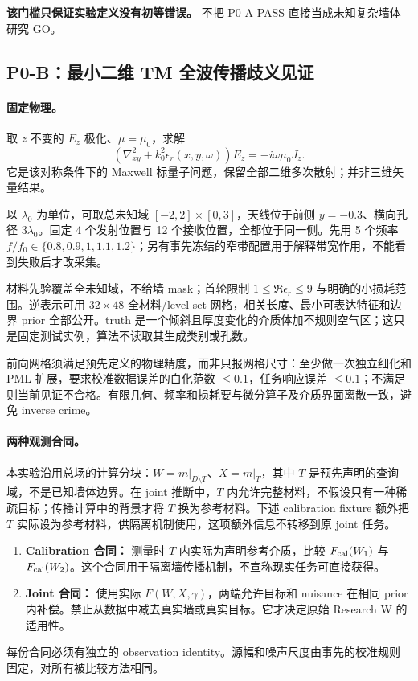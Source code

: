 \textbf{该门槛只保证实验定义没有初等错误。} 不把 P0-A PASS 直接当成未知复杂墙体研究 GO。

\subsection{P0-B：最小二维 TM 全波传播歧义见证}
\paragraph{固定物理。}
取 $z$ 不变的 $E_z$ 极化、$\mu=\mu_0$，求解
\[
(\nabla_{xy}^2+k_0^2\epsilon_r(x,y,\omega))E_z
=-i\omega\mu_0J_z.
\]
它是该对称条件下的 Maxwell 标量子问题，保留全部二维多次散射；并非三维矢量结果。

以 $\lambda_0$ 为单位，可取总未知域
$[-2,2]\times[0,3]$，天线位于前侧 $y=-0.3$、横向孔径 $3\lambda_0$。固定 4 个发射位置与 12 个接收位置，全都位于同一侧。先用 5 个频率 $f/f_0\in\{0.8,0.9,1,1.1,1.2\}$；另有事先冻结的窄带配置用于解释带宽作用，不能看到失败后才改采集。

材料先验覆盖全未知域，不给墙 mask；首轮限制 $1\le\Re\epsilon_r\le9$ 与明确的小损耗范围。逆表示可用 $32\times48$ 全材料/level-set 网格，相关长度、最小可表达特征和边界 prior 全部公开。truth 是一个倾斜且厚度变化的介质体加不规则空气区；这只是固定测试实例，算法不读取其生成类别或孔数。

前向网格须满足预先定义的物理精度，而非只报网格尺寸：至少做一次独立细化和 PML 扩展，要求校准数据误差的白化范数 $\le0.1$，任务响应误差 $\le0.1$；不满足则当前见证不合格。有限几何、频率和损耗要与微分算子及介质界面离散一致，避免 inverse crime。

\paragraph{两种观测合同。}
本实验沿用总场的计算分块：$W=m|_{D\setminus T}$、$X=m|_T$，其中 $T$ 是预先声明的查询域，不是已知墙体边界。在 joint 推断中，$T$ 内允许完整材料，不假设只有一种稀疏目标；传播计算中的背景才将 $T$ 换为参考材料。下述 calibration fixture 额外把 $T$ 实际设为参考材料，供隔离机制使用，这项额外信息不转移到原 joint 任务。
\begin{enumerate}
\item \textbf{Calibration 合同：} 测量时 $T$ 内实际为声明参考介质，比较 $F_{\rm cal}(W_1)$ 与 $F_{\rm cal}(W_2)$。这个合同用于隔离墙传播机制，不宣称现实任务可直接获得。
\item \textbf{Joint 合同：} 使用实际 $F(W,X,\gamma)$，两端允许目标和 nuisance 在相同 prior 内补偿。禁止从数据中减去真实墙或真实目标。它才决定原始 Research W 的适用性。
\end{enumerate}
每份合同必须有独立的 observation identity。源幅和噪声尺度由事先的校准规则固定，对所有被比较方法相同。

